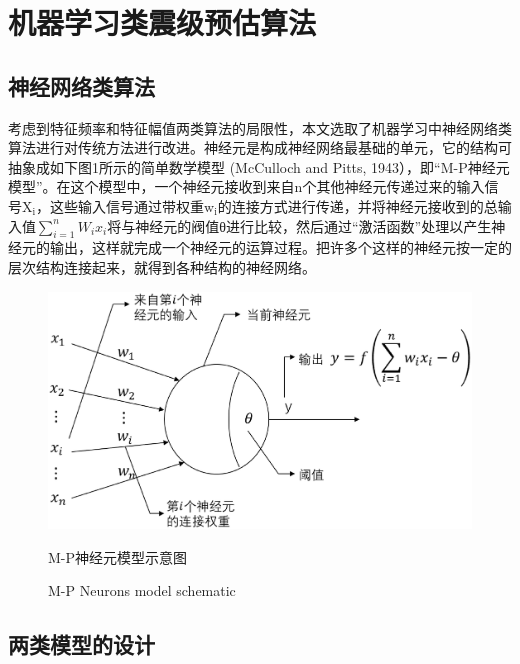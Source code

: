 
\chapter{机器学习类震级预估算法}

\section{神经网络类算法}

\indent 考虑到特征频率和特征幅值两类算法的局限性，本文选取了机器学习中神经网络类算法进行对传统方法进行改进。神经元是构成神经网络最基础的单元，它的结构可抽象成如下图1所示的简单数学模型 (McCulloch and Pitts, 1943），即“M-P神经元模型”。在这个模型中，一个神经元接收到来自n个其他神经元传递过来的输入信号$\mathrm{X}_{\mathrm{i}}$，这些输入信号通过带权重$\mathrm{w}_{\mathrm{i}}$的连接方式进行传递，并将神经元接收到的总输入值$\sum_{i=1}^{n} W_{i} x_{i}$将与神经元的阀值θ进行比较，然后通过“激活函数”处理以产生神经元的输出，这样就完成一个神经元的运算过程。把许多个这样的神经元按一定的层次结构连接起来，就得到各种结构的神经网络。
    
\begin{figure}[!h] 
\centering 
 \includegraphics[width=0.75\linewidth]{img/mp.eps} 
 \renewcommand{\figurename}{图} 
\caption{M-P神经元模型示意图} 
\addtocounter{figure}{-1} \vspace{-5pt} 
\renewcommand{\figurename}{Fig} 
\caption{M-P Neurons model schematic} 
\renewcommand{\figurename}{图} 
\label{fig:network-device-influence.png} 
\end{figure}



\section{两类模型的设计}

